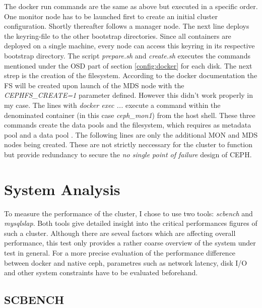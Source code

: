 \documentclass[titlepage, a4paper, 11pt]{scrartcl}
\begin{document}
                The docker run commands are the same as above but executed in a specific order. One monitor node has to be launched first to create an initial cluster configuration.
                Shortly thereafter follows a manager node. The next line deploys the keyring-file to the other bootstrap directories. Since all containers are deployed on a single machine, every node can access this keyring in its respective bootstrap directory. The script \textit{prepare.sh} and \textit{create.sh} executes the commands mentioned under the OSD part of section \ref*{config:docker} for each disk.
                The next strep is the creation of the filesystem. According to the docker documentation the FS will be created upon launch of the MDS node with the \textit{CEPHFS\_CREATE=1} parameter defined. However this didn't work properly in my case. The lines with \textit{docker exec ...} execute a command within the denominated container (in this case 
                \textit{ceph\_mon1}) from the host shell. These three commands create the data pools and the filesystem, which requires as metadata pool and a data pool \cite{CreateaCephfilesystem}.
                The following lines are only the additional MON and MDS nodes being created. These are not strictly neccessary for the cluster to function but provide redundancy to secure the \textit{no single point of failure} design of CEPH.

    \section{System Analysis}

        To measure the performance of the cluster, I chose to use two tools: \textit{scbench} and \textit{mysqlslap}. Both tools give detailed insight into
        the critical performances figures of such a cluster. Although there are seveal factors which are affecting overall performance, this test only provides a rather coarse overview of the system under test in general. For a more precise evaluation of the performance difference between docker and native ceph, parametres such as network latency, disk I/O and other system constraints have to be evaluated beforehand.

        \subsection{SCBENCH} 

        
\end{document}
